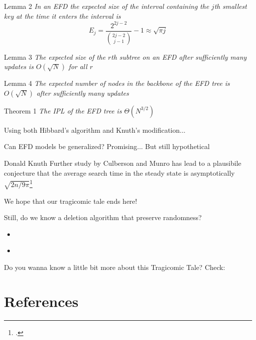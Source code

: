 \documentclass{beamer}
\begin{document}
\begin{frame}
    \pause
    \begin{alertblock}{Lemma 2}
        \textit{In an EFD the expected size of the interval containing the $j$th smallest key at the time it enters the interval is}
        $$
        E_j = \frac{2^{2j - 2}}{\binom{2j - 2}{j - 1}} - 1 \approx \sqrt{\pi j}
        $$
    \end{alertblock}
    \pause
    \begin{alertblock}{Lemma 3}
        \textit{The expected size of the $r$th subtree on an EFD after sufficiently many updates is $O(\sqrt{N})$ for all $r$}
    \end{alertblock}
    \pause
    \begin{alertblock}{Lemma 4}
        \textit{The expected number of nodes in the backbone of the EFD tree is $O(\sqrt{N})$ after sufficiently many updates}
    \end{alertblock}
\end{frame}
\begin{frame}
    \begin{alertblock}{Theorem 1}
        \textit{The IPL of the EFD tree is $\Theta(N^{3/2})$}
    \end{alertblock}
        Using both Hibbard's algorithm and Knuth's modification...
\end{frame}

\begin{frame}
    Can EFD models be generalized?
    \pause
    Promising... But still hypothetical
    \begin{block}{Donald Knuth}
        Further study by Culberson and Munro has lead to a plausibile conjecture that the average search time in the steady state is asymptotically $\sqrt{2n/9\pi}$\footcite{knuth1998art}
    \end{block}
    We hope that our tragicomic tale ends here!
\end{frame}


\begin{frame}
    Still, do we know a deletion algorithm that preserve randomness?
    \pause
    \begin{itemize}
        \item \cite{martinez1998randomized}
        \item \cite{seidel1996randomized}
    \end{itemize}
\end{frame}

\begin{frame}
    Do you wanna know a little bit more about this Tragicomic Tale? Check:

    \cite{panny2010deletions}
\end{frame}

\section{References}
\printbibliography
\frame{\titlepage}
\end{document}
